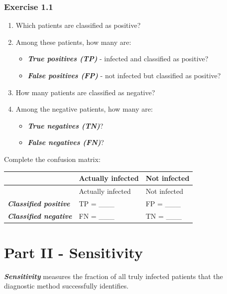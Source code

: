 \documentclass{course_sheet}
\begin{document}
\subsubsection*{Exercise 1.1}
\begin{enumerate}
\item
Which patients are classified as positive?

\item
Among these patients, how many are:

\begin{itemize}
\item
\textbf{\textit{True positives (TP)}} - infected and classified as positive?

\item
\textbf{\textit{False positives (FP)}} - not infected but classified as positive?

\end{itemize}
\item
How many patients are classified as negative?

\item
Among the negative patients, how many are:

\begin{itemize}
\item
\textbf{\textit{True negatives (TN)}}?

\item
\textbf{\textit{False negatives (FN)}}?

\end{itemize}
\end{enumerate}
Complete the confusion matrix:

\begingroup
\small
\setlength{\tabcolsep}{4pt}
\begin{longtable}{l|l|l}
\rule{0pt}{2.4ex} & Actually infected & Not infected \\[3pt]
\hline
\endfirsthead
\rule{0pt}{2.4ex} & Actually infected & Not infected \\[3pt]
\hline
\endhead
\textbf{\textit{Classified positive}} & TP = \_\_\_ & FP = \_\_\_ \\[1.5pt]
\textbf{\textit{Classified negative}} & FN = \_\_\_ & TN = \_\_\_ \\[1.5pt]
\end{longtable}
\endgroup
\clearpage
\section*{Part II - Sensitivity}
\textbf{\textit{Sensitivity}} measures the fraction of all truly infected patients that the diagnostic method successfully identifies.
\end{document}
